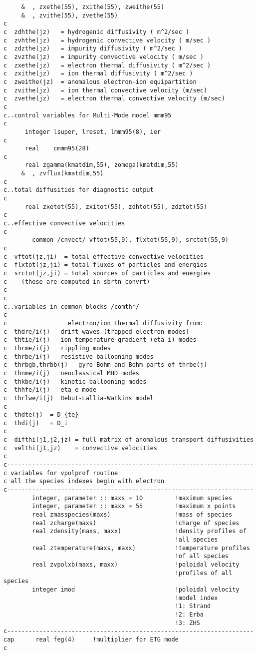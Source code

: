 \begin{verbatim}
     &  , zxethe(55), zxithe(55), zweithe(55)
     &  , zvithe(55), zvethe(55)
c
c  zdhthe(jz)   = hydrogenic diffusivity ( m^2/sec )
c  zvhthe(jz)   = hydrogenic convective velocity ( m/sec )
c  zdzthe(jz)   = impurity diffusivity ( m^2/sec )
c  zvzthe(jz)   = impurity convective velocity ( m/sec )
c  zxethe(jz)   = electron thermal diffusivity ( m^2/sec )
c  zxithe(jz)   = ion thermal diffusivity ( m^2/sec )
c  zweithe(jz)  = anomalous electron-ion equipartition
c  zvithe(jz)   = ion thermal convective velocity (m/sec)
c  zvethe(jz)   = electron thermal convective velocity (m/sec)
c
c..control variables for Multi-Mode model mmm95
c
      integer lsuper, lreset, lmmm95(8), ier
c
      real    cmmm95(28)
c
      real zgamma(kmatdim,55), zomega(kmatdim,55)
     &  , zvflux(kmatdim,55)
c
c..total diffusities for diagnostic output
c
      real zxetot(55), zxitot(55), zdhtot(55), zdztot(55)
c
c..effective convective velocities
c
        common /cnvect/ vftot(55,9), flxtot(55,9), srctot(55,9)
c
c  vftot(jz,ji)  = total effective convective velocities
c  flxtot(jz,ji) = total fluxes of particles and energies
c  srctot(jz,ji) = total sources of particles and energies
c    (these are computed in sbrtn convrt)
c
c
c..variables in common blocks /comth*/
c
c                 electron/ion thermal diffusivity from:
c  thdre/i(j)   drift waves (trapped electron modes)
c  thtie/i(j)   ion temperature gradient (eta_i) modes
c  thrme/i(j)   rippling modes
c  thrbe/i(j)   resistive ballooning modes
c  thrbgb,thrbb(j)   gyro-Bohm and Bohm parts of thrbe(j)
c  thnme/i(j)   neoclassical MHD modes
c  thkbe/i(j)   kinetic ballooning modes
c  thhfe/i(j)   eta_e mode
c  thrlwe/i(j)  Rebut-Lallia-Watkins model
c
c  thdte(j)  = D_{te}
c  thdi(j)   = D_i
c
c  difthi(j1,j2,jz) = full matrix of anomalous transport diffusivities
c  velthi(j1,jz)    = convective velocities
c
c---------------------------------------------------------------------
c variables for vpolprof routine
c all the species indexes begin with electron
c---------------------------------------------------------------------
        integer, parameter :: maxs = 10         !maximum species
        integer, parameter :: maxx = 55         !maximum x points
        real zmasspecies(maxs)                  !mass of species
        real zcharge(maxs)                      !charge of species
        real zdensity(maxs, maxx)               !density profiles of
                                                !all species
        real ztemperature(maxs, maxx)           !temperature profiles
                                                !of all species
        real zvpolxb(maxs, maxx)                !poloidal velocity
                                                !profiles of all species
        integer imod                            !poloidal velocity
                                                !model index
                                                !1: Strand
                                                !2: Erba
                                                !3: ZHS
c---------------------------------------------------------------------
cap      real feg(4)     !multiplier for ETG mode
c
\end{verbatim}

